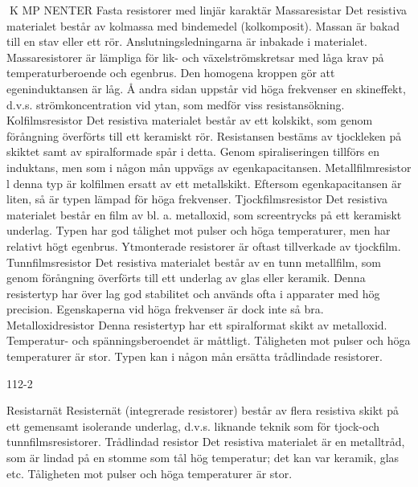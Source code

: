 \documentclass[a4paper,twoside,twocolumn,openright]{book}
\begin{document}
{{K MP NENTER
Fasta resistorer med linjär karaktär
Massaresistar
Det resistiva materialet består av kolmassa
med bindemedel (kolkomposit). Massan är
bakad till en stav eller ett rör. Anslutningsledningarna är inbakade i materialet.
Massaresistorer är lämpliga för lik- och
växelströmskretsar med låga krav på temperaturberoende och egenbrus. Den homogena kroppen gör att egeninduktansen är
låg. Å andra sidan uppstår vid höga frekvenser en skineffekt, d.v.s. strömkoncentration
vid ytan, som medför viss resistansökning.
Kolfilmsresistor
Det resistiva materialet består av ett kolskikt,
som genom förångning överförts till ett keramiskt rör. Resistansen bestäms av tjockleken på skiktet samt av spiralformade spår i
detta. Genom spiraliseringen tillförs en induktans, men som i någon mån uppvägs av
egenkapacitansen.
Metallfilmresistor
l denna typ är kolfilmen ersatt av ett metallskikt. Eftersom egenkapacitansen är liten,
så är typen lämpad för höga frekvenser.
Tjockfilmsresistor
Det resistiva materialet består en film av bl. a.
metalloxid, som screentrycks på ett keramiskt underlag. Typen har god tålighet mot
pulser och höga temperaturer, men har relativt högt egenbrus. Ytmonterade resistorer
är oftast tillverkade av tjockfilm.
Tunnfilmsresistor
Det resistiva materialet består av en tunn
metallfilm, som genom förångning överförts
till ett underlag av glas eller keramik.
Denna resistertyp har över lag god stabilitet och används ofta i apparater med hög
precision. Egenskaperna vid höga frekvenser är dock inte så bra.
Metalloxidresistor
Denna resistertyp har ett spiralformat skikt
av metalloxid. Temperatur- och spänningsberoendet är måttligt. Tåligheten mot pulser
och höga temperaturer är stor. Typen kan i
någon mån ersätta trådlindade resistorer.

112-2

Resistarnät
Resisternät (integrerade resistorer) består
av flera resistiva skikt på ett gemensamt
isolerande underlag, d.v.s. liknande teknik
som för tjock-och tunnfilmsresistorer.
Trådlindad resistor
Det resistiva materialet är en metalltråd,
som är lindad på en stomme som tål hög
temperatur; det kan var keramik, glas etc.
Tåligheten mot pulser och höga temperaturer är stor.

}}
\end{document}

